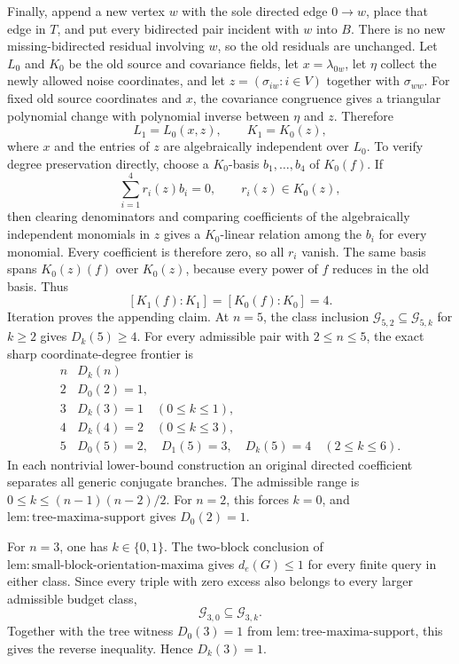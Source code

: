 Finally, append a new vertex \(w\) with the sole directed edge \(0\to w\), place that edge in \(T\), and put every bidirected pair incident with \(w\) into \(B\). There is no new missing-bidirected residual involving \(w\), so the old residuals are unchanged. Let \(L_0\) and \(K_0\) be the old source and covariance fields, let \(x=\lambda_{0w}\), let \(\eta\) collect the newly allowed noise coordinates, and let \(z=(\sigma_{iw}:i\in V)\) together with \(\sigma_{ww}\). For fixed old source coordinates and \(x\), the covariance congruence gives a triangular polynomial change with polynomial inverse between \(\eta\) and \(z\). Therefore
\[
 L_1=L_0(x,z),\qquad K_1=K_0(z),
\]
where \(x\) and the entries of \(z\) are algebraically independent over \(L_0\). To verify degree preservation directly, choose a \(K_0\)-basis \(b_1,\ldots,b_4\) of \(K_0(f)\). If
\[
 \sum_{i=1}^4 r_i(z)b_i=0,\qquad r_i(z)\in K_0(z),
\]
then clearing denominators and comparing coefficients of the algebraically independent monomials in \(z\) gives a \(K_0\)-linear relation among the \(b_i\) for every monomial. Every coefficient is therefore zero, so all \(r_i\) vanish. The same basis spans \(K_0(z)(f)\) over \(K_0(z)\), because every power of \(f\) reduces in the old basis. Thus
\[
 [K_1(f):K_1]=[K_0(f):K_0]=4.
\]
Iteration proves the appending claim. At \(n=5\), the class inclusion \(\mathcal G_{5,2}\subseteq\mathcal G_{5,k}\) for \(k\geq2\) gives \(D_k(5)\geq4\).
For every admissible pair with \(2\leq n\leq5\), the exact sharp coordinate-degree frontier is
\[
\begin{array}{c|c}
 n & D_k(n)\\ \hline
 2 & D_0(2)=1,\\
 3 & D_k(3)=1\quad(0\leq k\leq1),\\
 4 & D_k(4)=2\quad(0\leq k\leq3),\\
 5 & D_0(5)=2,\quad D_1(5)=3,\quad D_k(5)=4\quad(2\leq k\leq6).
\end{array}
\]
In each nontrivial lower-bound construction an original directed coefficient separates all generic conjugate branches.
The admissible range is \(0\leq k\leq(n-1)(n-2)/2\). For \(n=2\), this forces \(k=0\), and \(\mathrm{lem:tree\mbox{-}maxima\mbox{-}support}\) gives \(D_0(2)=1\).

For \(n=3\), one has \(k\in\{0,1\}\). The two-block conclusion of \(\mathrm{lem:small\mbox{-}block\mbox{-}orientation\mbox{-}maxima}\) gives \(d_e(G)\leq1\) for every finite query in either class. Since every triple with zero excess also belongs to every larger admissible budget class,
\[
 \mathcal G_{3,0}\subseteq\mathcal G_{3,k}.
\]
Together with the tree witness \(D_0(3)=1\) from \(\mathrm{lem:tree\mbox{-}maxima\mbox{-}support}\), this gives the reverse inequality. Hence \(D_k(3)=1\).

